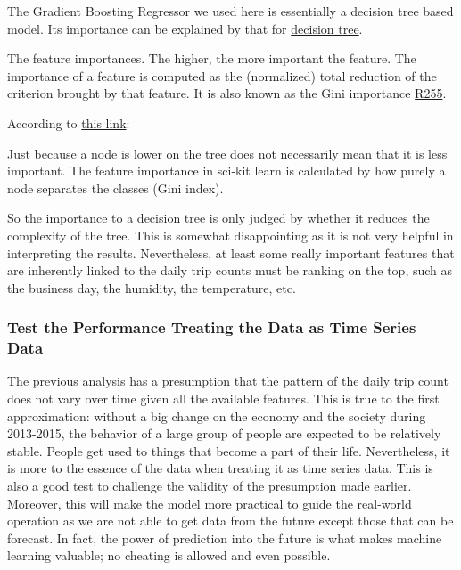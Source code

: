 \documentclass[a4paper]{article}
\begin{document}
			The Gradient Boosting Regressor we used here is essentially a decision tree based model. Its importance can be explained by that for \href{|http://scikit-learn.org/stable/modules/generated/sklearn.tree.DecisionTreeRegressor.html}{decision tree}. 
			
			\begin{leftbar}
				The feature importances. The higher, the more important the feature. The importance of a feature is computed as the (normalized) total reduction of the criterion brought by that feature. It is also known as the Gini importance \href{https://www.stat.berkeley.edu/~breiman/RandomForests/cc_home.htm#varimp}{R255}.
			\end{leftbar}
			
			According to \href{https://datascience.stackexchange.com/questions/16693/interpreting-decision-tree-in-context-of-feature-importances}{this link}:
			
			\begin{leftbar}
				Just because a node is lower on the tree does not necessarily mean that it is less important. The feature importance in sci-kit learn is calculated by how purely a node separates the classes (Gini index).
			\end{leftbar}
			
			So the importance to a decision tree is only judged by whether it reduces the complexity of the tree. This is somewhat disappointing as it is not very helpful in interpreting the results. Nevertheless, at least some really important features that are inherently linked to the daily trip counts must be ranking on the top, such as the business day, the humidity, the temperature, etc.
			
			\subsubsection{Test the Performance Treating the Data as Time Series Data}
			The previous analysis has a presumption that the pattern of the daily trip count does not vary over time given all the available features. This is true to the first approximation: without a big change on the economy and the society during 2013-2015, the behavior of a large group of people are expected to be relatively stable. People get used to things that become a part of their life. Nevertheless, it is more to the essence of the data when treating it as time series data. This is also a good test to challenge the validity of the presumption made earlier. Moreover, this will make the model more practical to guide the real-world operation as we are not able to get data from the future except those that can be forecast. In fact, the power of prediction into the future is what makes machine learning valuable; no cheating is allowed and even possible.
			
\end{document}
